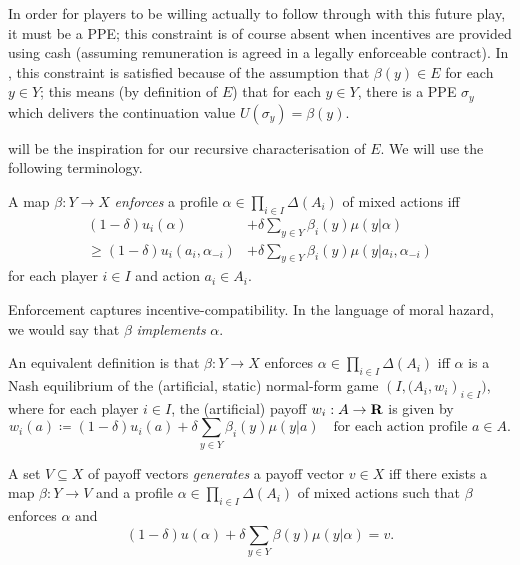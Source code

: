 In order for players to be willing actually to follow through with this future play, it must be a PPE; this constraint is of course absent when incentives are provided using cash (assuming remuneration is agreed in a legally enforceable contract). In , this constraint is satisfied because of the assumption that $\beta(y) \in E$ for each $y \in Y$; this means (by definition of $E$) that for each $y \in Y$, there is a PPE $\sigma_y$ which delivers the continuation value $U(\sigma_y) = \beta(y)$.

 will be the inspiration for our recursive characterisation of $E$. We will use the following terminology.

\begin{definition}
	\label{definition:enforcement}
	A map $\beta : Y \to X$ \emph{enforces} a profile $\alpha \in \prod_{i \in I} \Delta(A_i)$ of mixed actions iff
	\begin{align*}
		(1-\delta) u_i(\alpha) &+ \delta \sum_{y \in Y} \beta_i(y) \mu(y|\alpha)
		\\
		\geq (1-\delta) u_i(a_i,\alpha_{-i}) &+ \delta \sum_{y \in Y} \beta_i(y) \mu(y|a_i,\alpha_{-i})
	\end{align*}
	for each player $i \in I$ and action $a_i \in A_i$.
\end{definition}

Enforcement captures incentive-compatibility. In the language of moral hazard, we would say that $\beta$ \emph{implements} $\alpha$.

\begin{remark}
	\label{remark:enforc_nash}
	An equivalent definition is that $\beta : Y \to X$ enforces $\alpha \in \prod_{i \in I} \Delta(A_i)$ iff $\alpha$ is a Nash equilibrium of the (artificial, static) normal-form game $\left(I,(A_i,w_i\right)_{i \in I})$, where for each player $i \in I$, the (artificial) payoff $w_i : A \to \mathbf{R}$ is given by
	\begin{equation*}
		w_i(a) \coloneqq (1-\delta) u_i(a) + \delta \sum_{y \in Y} \beta_i(y) \mu(y|a)
		\quad \text{for each action profile $a \in A$.}
	\end{equation*}
\end{remark}

\begin{definition}
	\label{definition:generation}
	A set $V \subseteq X$ of payoff vectors \emph{generates} a payoff vector $v \in X$ iff there exists a map $\beta : Y \to V$ and a profile $\alpha \in \prod_{i \in I} \Delta(A_i)$ of mixed actions such that $\beta$ enforces $\alpha$ and
	\begin{equation*}
		(1-\delta) u(\alpha)
		+ \delta \sum_{y \in Y} \beta(y) \mu(y|\alpha) 
		= v.
	\end{equation*}
\end{definition}

